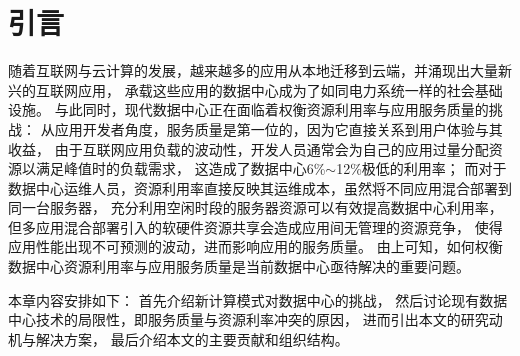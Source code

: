 

\chapter{引言}
\label{chap:intro}

随着互联网与云计算的发展，越来越多的应用从本地迁移到云端，并涌现出大量新兴的互联网应用，
承载这些应用的数据中心成为了如同电力系统一样的社会基础设施。
与此同时，现代数据中心正在面临着权衡资源利用率与应用服务质量的挑战：
从应用开发者角度，服务质量是第一位的，因为它直接关系到用户体验与其收益，
由于互联网应用负载的波动性，开发人员通常会为自己的应用过量分配资源以满足峰值时的负载需求，
这造成了数据中心6\%$\sim$12\%极低的利用率；
而对于数据中心运维人员，资源利用率直接反映其运维成本，虽然将不同应用混合部署到同一台服务器，
充分利用空闲时段的服务器资源可以有效提高数据中心利用率，
但多应用混合部署引入的软硬件资源共享会造成应用间无管理的资源竞争，
使得应用性能出现不可预测的波动，进而影响应用的服务质量。
由上可知，如何权衡数据中心资源利用率与应用服务质量是当前数据中心亟待解决的重要问题。


本章内容安排如下：
首先介绍新计算模式对数据中心的挑战，
然后讨论现有数据中心技术的局限性，即服务质量与资源利率冲突的原因，
进而引出本文的研究动机与解决方案，
最后介绍本文的主要贡献和组织结构。

%

